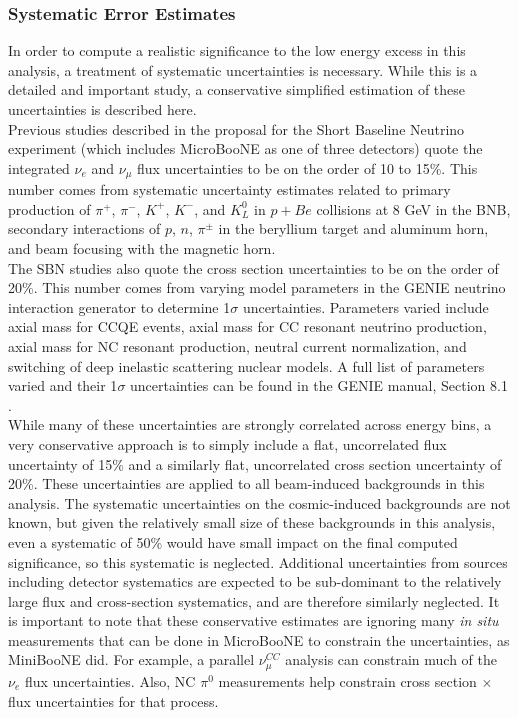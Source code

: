 \subsubsection{Systematic Error Estimates}

In order to compute a realistic significance to the low energy excess in this analysis, a treatment of systematic uncertainties is necessary. While this is a detailed and important study, a conservative simplified estimation of these uncertainties is described here.\\

Previous studies described in the proposal for the Short Baseline Neutrino experiment (which includes MicroBooNE as one of three detectors) \cite{SBNproposal} quote the integrated $\nu_e$ and $\nu_\mu$ flux uncertainties to be on the order of 10 to 15\%. This number comes from systematic uncertainty estimates related to primary production of $\pi^+$, $\pi^-$, $K^+$, $K^-$, and $K^0_L$ in $p+Be$ collisions at 8 GeV in the BNB, secondary interactions of $p$, $n$, $\pi^\pm$ in the beryllium target and aluminum horn, and beam focusing with the magnetic horn.\\

The SBN studies also quote the cross section uncertainties to be on the order of 20\%. This number comes from varying model parameters in the GENIE neutrino interaction generator to determine 1$\sigma$ uncertainties. Parameters varied include axial mass for CCQE events, axial mass for CC resonant neutrino production, axial mass for NC resonant production, neutral current normalization, and switching of deep inelastic scattering nuclear models. A full list of parameters varied and their 1$\sigma$ uncertainties can be found in the GENIE manual, Section 8.1 \cite{GENIEsource}.\\

While many of these uncertainties are strongly correlated across energy bins, a very conservative approach is to simply include a flat, uncorrelated flux uncertainty of 15\% and a similarly flat, uncorrelated cross section uncertainty of 20\%. These uncertainties are applied to all beam-induced backgrounds in this analysis. The systematic uncertainties on the cosmic-induced backgrounds are not known, but given the relatively small size of these backgrounds in this analysis, even a systematic of 50\% would have small impact on the final computed significance, so this systematic is neglected. Additional uncertainties from sources including detector systematics are expected to be sub-dominant to the relatively large flux and cross-section systematics, and are therefore similarly neglected. It is important to note that these conservative estimates are ignoring many \textit{in situ} measurements that can be done in MicroBooNE to constrain the uncertainties, as MiniBooNE did. For example, a parallel $\nu_\mu^{CC}$ analysis can constrain much of the $\nu_e$ flux uncertainties. Also, NC $\pi^0$ measurements help constrain cross section $\times$ flux uncertainties for that process.\\

